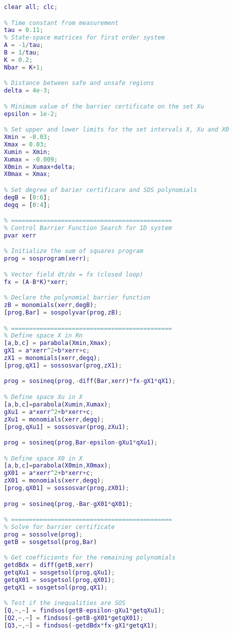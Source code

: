 \begin{lstlisting}[language=matlab]
% 1D first order system FOR ERROR STATE
clear all; clc; 

% Time constant from measurement
tau = 0.11;
% State-space matrices for first order system
A = -1/tau;
B = 1/tau;
K = 0.2;
Nbar = K+1;

% Distance between safe and unsafe regions
delta = 4e-3;

% Minimum value of the barrier certificate on the set Xu
epsilon = 1e-2;

% Set upper and lower limits for the set intervals X, Xu and X0
Xmin = -0.03;
Xmax = 0.03;
Xumin = Xmin;
Xumax = -0.009;
X0min = Xumax+delta;
X0max = Xmax;

% Set degree of barier certificare and SOS polynomials
degB = [0:6];
degq = [0:4];

% =============================================
% Control Barrier Function Search for 1D system
pvar xerr

% Initialize the sum of squares program
prog = sosprogram(xerr);

% Vector field dt/dx = fx (closed loop)
fx = (A-B*K)*xerr;

% Declare the polynomial barrier function
zB = monomials(xerr,degB);
[prog,Bar] = sospolyvar(prog,zB);

% =============================================
% Define space X in Rn
[a,b,c] = parabola(Xmin,Xmax); 
gX1 = a*xerr^2+b*xerr+c;
zX1 = monomials(xerr,degq);
[prog,qX1] = sossosvar(prog,zX1);

prog = sosineq(prog,-diff(Bar,xerr)*fx-gX1*qX1);

% Define space Xu in X
[a,b,c]=parabola(Xumin,Xumax);
gXu1 = a*xerr^2+b*xerr+c;
zXu1 = monomials(xerr,degq);
[prog,qXu1] = sossosvar(prog,zXu1);

prog = sosineq(prog,Bar-epsilon-gXu1*qXu1);

% Define space X0 in X
[a,b,c]=parabola(X0min,X0max);
gX01 = a*xerr^2+b*xerr+c;
zX01 = monomials(xerr,degq);
[prog,qX01] = sossosvar(prog,zX01);

prog = sosineq(prog,-Bar-gX01*qX01);

% =============================================
% Solve for barrier certificate
prog = sossolve(prog);
getB = sosgetsol(prog,Bar)

% Get coefficients for the remaining polynomials
getdBdx = diff(getB,xerr)
getqXu1 = sosgetsol(prog,qXu1);
getqX01 = sosgetsol(prog,qX01);
getqX1 = sosgetsol(prog,qX1);

% Test if the inequalities are SOS
[Q,~,~] = findsos(getB-epsilon-gXu1*getqXu1);
[Q2,~,~] = findsos(-getB-gX01*getqX01);
[Q3,~,~] = findsos(-getdBdx*fx-gX1*getqX1);
\end{lstlisting}

